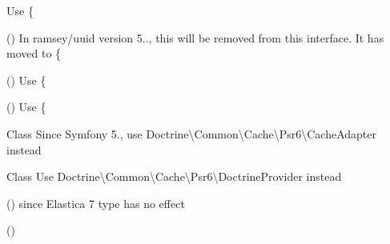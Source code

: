 \begin{DoxyRefList}
%
Use \{ 
\item[\doxylink{report_8contract_8php_a77b973d137fb33212e018b042df6e3e7}{Global(e)} \doxylink{interface_ramsey_1_1_uuid_1_1_deprecated_uuid_interface_a20576339466f339523acf58110ca08a0}{Deprecated\+Uuid\+Interface\+::get\+Urn} ()]\label{deprecated__deprecated000126}%
%
In ramsey/uuid version 5.., this will be removed from this interface. It has moved to \{ 
\item[\doxylink{report_8contract_8php_a77b973d137fb33212e018b042df6e3e7}{Global(e)} \doxylink{interface_ramsey_1_1_uuid_1_1_deprecated_uuid_interface_a9b409c2fa138f64af4837a34bfe639e4}{Deprecated\+Uuid\+Interface\+::get\+Variant} ()]\label{deprecated__deprecated000127}%
%
Use \{ 
\item[\doxylink{report_8contract_8php_a77b973d137fb33212e018b042df6e3e7}{Global(e)} \doxylink{interface_ramsey_1_1_uuid_1_1_deprecated_uuid_interface_afa8e7a3a646144eab50188b7a805a389}{Deprecated\+Uuid\+Interface\+::get\+Version} ()]\label{deprecated__deprecated000128}%
%
Use \{ 
\item[Class \doxylink{class_symfony_1_1_component_1_1_cache_1_1_adapter_1_1_doctrine_adapter}{Doctrine\+Adapter} ]\label{deprecated__deprecated000227}%
%
Since Symfony 5., use Doctrine\textbackslash{}\+Common\textbackslash{}\+Cache\textbackslash{}\+Psr6\textbackslash{}\+Cache\+Adapter instead  
\item[Class \doxylink{class_symfony_1_1_component_1_1_cache_1_1_doctrine_provider}{Doctrine\+Provider} ]\label{deprecated__deprecated000229}%
%
Use Doctrine\textbackslash{}\+Common\textbackslash{}\+Cache\textbackslash{}\+Psr6\textbackslash{}\+Doctrine\+Provider instead  
\item[\doxylink{report_8contract_8php_a77b973d137fb33212e018b042df6e3e7}{Global(e)} \doxylink{class_monolog_1_1_formatter_1_1_elastica_formatter_a830b5c75df72b32396701bc563fbe3c7}{Elastica\+Formatter\+::get\+Type} ()]\label{deprecated__deprecated000099}%
%
since Elastica 7 type has no effect  
\item[\doxylink{report_8contract_8php_a77b973d137fb33212e018b042df6e3e7}{Global(e)} \doxylink{class_entity_a08c3e521752d61f46fb02786dee96468}{Entity\+::clean\+Entity\+Selector\+Cache} ()]\label{deprecated__deprecated000006}%

\end{DoxyRefList}
